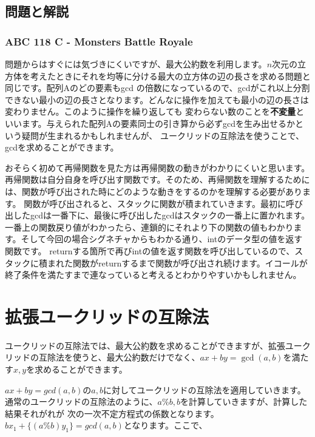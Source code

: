 \documentclass{jlreq}
\begin{document}
\subsection{問題と解説}
\subsubsection{ABC 118 C - Monsters Battle Royale}
問題からはすぐには気づきにくいですが、最大公約数を利用します。$n$次元の立方体を考えたときにそれを均等に分ける最大の立方体の辺の長さを求める問題と同じです。配列Aのどの要素もgcd
の倍数になっているので、gcdがこれ以上分割できない最小の辺の長さとなります。どんなに操作を加えても最小の辺の長さは変わりません。このように操作を繰り返しても
変わらない数のことを\textbf{不変量}といいます。与えられた配列Aの要素同士の引き算から必ずgcdを生み出せるかという疑問が生まれるかもしれませんが、
ユークリッドの互除法を使うことで、gcdを求めることができます。

\begin{tcolorbox}[enhanced, title=コラム 再帰関数, breakable, colback=white, drop fuzzy shadow, attach boxed title to top center={yshift*=0.1cm}]
  おそらく初めて再帰関数を見た方は再帰関数の動きがわかりにくいと思います。再帰関数は自分自身を呼び出す関数です。そのため、再帰関数を理解するためには、関数が呼び出された時にどのような動きをするのかを理解する必要があります。
  関数が呼び出されると、スタックに関数が積まれていきます。最初に呼び出したgcdは一番下に、最後に呼び出したgcdはスタックの一番上に置かれます。一番上の関数戻り値がわかったら、連鎖的にそれより下の関数の値もわかります。そして今回の場合シグネチャからもわかる通り、intのデータ型の値を返す関数です。
  returnする箇所で再びintの値を返す関数を呼び出しているので、スタックに積まれた関数がreturnするまで関数が呼び出され続けます。イコールが
  終了条件を満たすまで連なっていると考えるとわかりやすいかもしれません。
\end{tcolorbox}



\section{拡張ユークリッドの互除法}

ユークリッドの互除法では、最大公約数を求めることができますが、拡張ユークリッドの互除法を使うと、最大公約数だけでなく、$ax + by = \gcd(a, b)$を満たす$x, y$を求めることができます。

$ax + by = gcd(a, b)$の$a, b$に対してユークリッドの互除法を適用していきます。通常のユークリッドの互除法のように、$a \% b, b$を計算していきますが、計算した結果それがれが
次の一次不定方程式の係数となります。$b x_1 + \{(a\%b) y_1\} = gcd(a, b)$となります。ここで、
\end{document}
